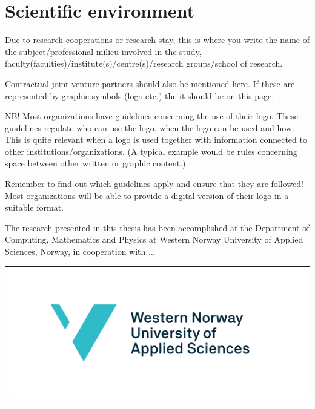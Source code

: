 \chapter{Scientific environment}

Due to research cooperations or research stay, this is where you write the name of the subject/professional milieu involved in the study, faculty(faculties)/institute(s)/centre(s)/research groups/school of research.

Contractual joint venture partners should also be mentioned here. If these are represented by graphic symbols (logo etc.) the it should be on this page.

NB! Most organizations have guidelines concerning the use of their logo. These guidelines regulate who can use the logo, when the logo can be used and how. This is quite relevant when a logo is used together with information connected to other institutions/organizations. (A typical example would be rules concerning space between other written or graphic content.)

Remember to find out which guidelines apply and ensure that they are followed!
Most organizations will be able to provide a digital version of their logo in a suitable format.

\eg The research presented in this thesis has been accomplished
at the Department of Computing, Mathematics and Physics
at Western Norway University of Applied Sciences, Norway,
in cooperation with ...

\hspace{8em}
\begin{tabular}{l}
  \includegraphics[scale=0.36, center]{logos/hvl_logo.pdf}\\
\end{tabular}
